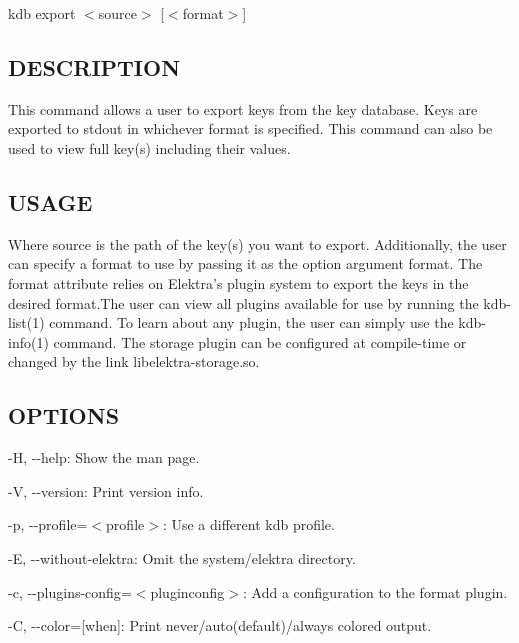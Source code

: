 {\ttfamily kdb export $<$source$>$ \mbox{[}$<$format$>$\mbox{]}}

\subsection*{D\+E\+S\+C\+R\+I\+P\+T\+I\+O\+N}

This command allows a user to export keys from the key database. Keys are exported to {\ttfamily stdout} in whichever format is specified. This command can also be used to view full key(s) including their values.

\subsection*{U\+S\+A\+G\+E}

Where {\ttfamily source} is the path of the key(s) you want to export. Additionally, the user can specify a format to use by passing it as the option argument {\ttfamily format}. The {\ttfamily format} attribute relies on Elektra's plugin system to export the keys in the desired format.\+The user can view all plugins available for use by running the kdb-\/list(1) command. To learn about any plugin, the user can simply use the kdb-\/info(1) command. The {\ttfamily storage} plugin can be configured at compile-\/time or changed by the link {\ttfamily libelektra-\/storage.\+so}.

\subsection*{O\+P\+T\+I\+O\+N\+S}


\begin{DoxyItemize}
\item {\ttfamily -\/\+H}, {\ttfamily -\/-\/help}\+: Show the man page.
\item {\ttfamily -\/\+V}, {\ttfamily -\/-\/version}\+: Print version info.
\item {\ttfamily -\/p}, {\ttfamily -\/-\/profile}=$<$profile$>$\+: Use a different kdb profile.
\item {\ttfamily -\/\+E}, {\ttfamily -\/-\/without-\/elektra}\+: Omit the {\ttfamily system/elektra} directory.
\item {\ttfamily -\/c}, {\ttfamily -\/-\/plugins-\/config}=$<$pluginconfig$>$\+: Add a configuration to the format plugin.
\item {\ttfamily -\/\+C}, {\ttfamily -\/-\/color}=\mbox{[}when\mbox{]}\+: Print never/auto(default)/always colored output.
\end{DoxyItemize}

